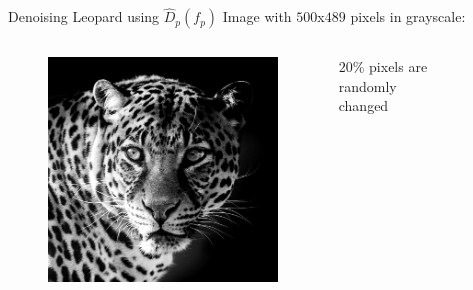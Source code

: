 \documentclass[mathserif]{beamer}
\begin{document}
\begin{frame}{Denoising Leopard using $\hat D_p(f_p)$ }
    Image with $500$x$489$ pixels in grayscale:
    
    \begin{columns}
        \begin{column}{0.4\textwidth}
            \begin{figure}[h]
                \centering
                \includegraphics[width=.99\textwidth]{../testimages/leopard/leopard_500.png}
            \end{figure}
        \end{column}
        \begin{column}{0.2\textwidth}
            \centering
            $20$\% pixels are randomly changed 
        \end{column}
        \begin{column}{0.4\textwidth}
            \begin{figure}[h]
                \centering

\end{figure}
\end{column}
\end{columns}
\end{frame}
\end{document}
